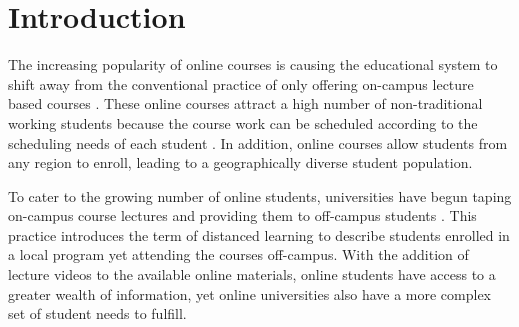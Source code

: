 \documentclass{sig-alternate}
\begin{document}









\section{Introduction}
The increasing popularity of online courses is causing the educational
system to shift away from the conventional practice of only offering
on-campus lecture based courses \cite{BELLER,DOE}.  These online
courses attract a high number of non-traditional working students
because the course work can be scheduled according to the scheduling
needs of each student \cite{BURGESS}.  In addition, online courses
allow students from any region to enroll, leading to a geographically
diverse student population.

To cater to the growing number of online students, universities have
begun taping on-campus course lectures and providing them to
off-campus students \cite{CVN,SCPD}.  This practice introduces the
term of distanced learning to describe students enrolled in a local
program yet attending the courses off-campus.  With the addition of
lecture videos to the available online materials, online students have
access to a greater wealth of information, yet online universities
also have a more complex set of student needs to fulfill.
\end{document}
